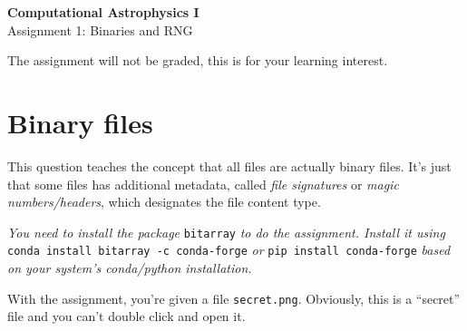 \documentclass[12pt]{article}
\begin{document}
\begin{center}
    \Large \textbf{Computational Astrophysics I}\\[6pt]
    \large Assignment 1: Binaries and RNG\\[6pt]
\end{center}


\bigskip


The assignment will not be graded, this is for your learning interest.


\section{Binary files}

This question teaches the concept that all files are actually binary files. It's just that some files has additional metadata, called \textit{file signatures} or \textit{magic numbers/headers}, which designates the file content type.

\vspace{10pt}

\textit{You need to install the package} \texttt{bitarray} \textit{to do the assignment. Install it using} \texttt{conda install bitarray -c conda-forge} \textit{or} \texttt{pip install conda-forge} \textit{based on your system's conda/python installation.}

\vspace{10pt}

With the assignment, you're given a file \texttt{secret.png}. Obviously, this is a ``secret'' file and you can't double click and open it.
\end{document}
